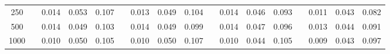 % 
\begin{tabular}{ccccccccccccccccc}
  \hline
  \hline
250 &  & 0.014 & 0.053 & 0.107 &  & 0.013 & 0.049 & 0.104 &  & 0.014 & 0.046 & 0.093 &  & 0.011 & 0.043 & 0.082 \\ 
  500 &  & 0.014 & 0.049 & 0.103 &  & 0.014 & 0.049 & 0.099 &  & 0.014 & 0.047 & 0.096 &  & 0.013 & 0.044 & 0.091 \\ 
  1000 &  & 0.010 & 0.050 & 0.105 &  & 0.010 & 0.050 & 0.107 &  & 0.010 & 0.044 & 0.105 &  & 0.009 & 0.043 & 0.097 \\ 
   \hline
\end{tabular}
